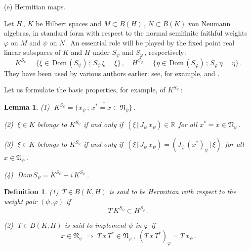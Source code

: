 \documentclass[reqno]{amsart}
\newtheorem{lemma}[theorem]{Lemma}
\newtheorem{definition}[theorem]{Definition}
\theoremstyle{definition}
\theoremstyle{remark}
\numberwithin{equation}{section}
\theoremstyle{plain}
\begin{document}
\bigskip
\noindent (e) {\sc Hermitian maps}.
\bigskip

Let $H\, ,\, K$ be Hilbert spaces and $M\subset B(H)\, ,\, N\subset B(K)$
von Neumann algebras, in standard form with respect to the normal
semifinite faithful weights $\varphi$ on $M$ and $\psi$ on $N\,$. An
essential role will be played by the fixed point real linear subspaces
of $K$ and $H$ under $S_\psi$ and $S_\varphi\,$, respectively:
\begin{equation*}
K^{S_\psi} =\{\xi\in\,\text{Dom}\, (S_\psi )\, ;\, S_\psi\,\xi =\xi\}
\, ,\quad H^{S_\varphi} =\{\eta\in\,\text{Dom}\, (S_\varphi )\, ;\,
S_\varphi\,\eta =\eta\}\, .
\end{equation*}
They have been used by various authors earlier: see, for example,
\cite{Ri-VD} and \cite{Dav}.

Let us formulate the basic properties, for example, of $K^{S_\psi}\,$:
\smallskip

\begin{lemma}\label{fixed}
{\rm (1)} $\; K^{S_\psi} =\overline{\{ x_\psi\, ;\, x^*=x\in
\mathfrak N_\psi\}}\,$.

{\rm (2)} $\; \xi\in K$ belongs to $K^{S_\psi}$ if and only if
$\, (\xi\, |\, J_\psi\, x_\psi )\in\mathbb R\,$ for all $x^*=x\in
\mathfrak N_\psi\,$.

{\rm (3)} $\; \xi\in K$ belongs to $K^{S_\psi}$ if and only if
$\, (\xi\, |\, J_\psi\, x_\psi ) =(J_\psi\, (x^*)_\psi\, |\,\xi )\,$
for all \\ \phantom{xxxxxx} $x\in\mathfrak A_\psi\,$.

{\rm (4)} $\;${\rm Dom}$\, S_\psi =K^{S_\psi} +i\, K^{S_\psi}\,$.
\end{lemma}
\smallskip

\begin{definition}\label{def.herm}
{\rm (1)} $\, T\in B(K,H)$ is said to be Hermitian with respect to the
weight pair $(\psi ,\varphi )$ if
\begin{equation*}
T\, K^{S_\psi}\subset H^{S_\varphi}\, .
\end{equation*}

{\rm (2)} $\; T\in B(K,H)$ is said to implement $\psi$ in $\varphi$ if
\begin{equation*}
x\in \mathfrak N_\psi\;\Longrightarrow\; T\, x\, T^*\in
\mathfrak N_\varphi\, ,\; (T\, x\, T^*)_\varphi =T\, x_\psi\, .
\end{equation*}
\end{definition}
\smallskip
\end{document}

